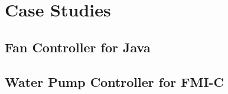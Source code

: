 \section{Case Studies}
\subsection{Fan Controller for Java}
\subsection{Water Pump Controller for FMI-C}

